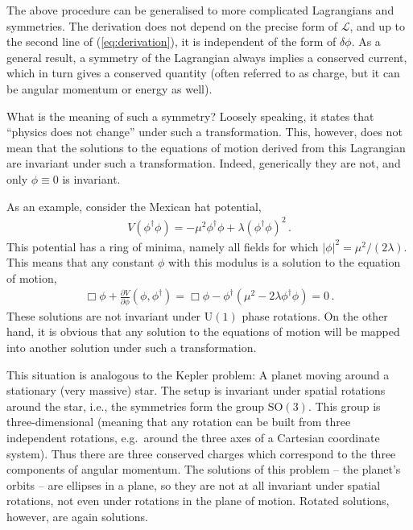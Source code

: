 \documentclass[12pt]{report}
\renewcommand{\L}{\ensuremath{\mathscr{L}}}
\newcommand{\2}{\ensuremath{\sqrt{2}\,}}
\renewcommand{\L}{\ensuremath{\mathscr{L}}}
\begin{document}
{      The above procedure can be generalised to more complicated Lagrangians and
      symmetries. The derivation does not depend on the precise form of $\L$, and up to the second
      line of (\ref{eq:derivation}), it is independent of the form of $\delta \phi$. As a general
      result, a symmetry of the Lagrangian always implies a conserved current, which in turn gives a
      conserved quantity (often referred to as charge, but it can be angular momentum or energy as
      well). 
      
      What is the meaning of such a symmetry? Loosely speaking, it states that ``physics does not
      change'' under such a transformation. This, however, does not mean that the solutions to the
      equations of motion derived from this Lagrangian are invariant under such a
      transformation. Indeed, generically they are not, and only $\phi\equiv 0$ is invariant.

      As an example, consider the Mexican hat potential,
      \begin{align}
        V(\phi^\dagger\phi)=-\mu^2 \phi^\dagger\phi +\lambda\left(\phi^\dagger\phi\right)^2\,.
      \end{align}
      This potential has a ring of minima, namely all fields for which
      $\left|\phi\right|^2=\mu^2/(2\lambda)$. This means that any constant $\phi$ with this modulus
      is a solution to the equation of motion,  
      \begin{align}
        \Box \phi +\frac{\partial V}{\partial \phi}\! \left(\phi,\phi^\dagger\right) = \Box \phi -\phi^\dagger
        \left(\mu^2-2\lambda\phi^\dagger\phi \right)=0\,.
      \end{align}
      These solutions are not invariant under $\mathrm{U(1)}$ phase rotations. On the other hand,
      it is obvious that any solution to the equations of motion will be mapped into another
      solution under such a transformation.
      
      This situation is analogous to the Kepler problem: A planet moving
      around a stationary 
      (very massive) star. The setup is invariant under spatial rotations around the star, i.e., the
      symmetries form the group $\mathrm{SO(3)}$. This group is three-dimensional 
      (meaning that any rotation can be built from three independent rotations, e.g.\ around the
      three axes of a Cartesian coordinate system). Thus there are three conserved charges
      which correspond to the three components of angular momentum. The
      solutions of this problem -- the planet's orbits -- are ellipses in a plane, so they are not
      at all invariant under spatial rotations, not even under rotations in the plane of
      motion. Rotated solutions, however, are again solutions.
      
}
\end{document}
